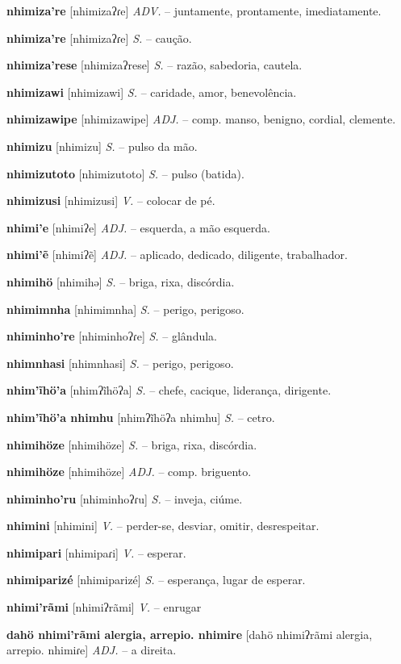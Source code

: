 \textbf{nhimiza're} [nhimizaʔɾe] \textit{ADV.} -- juntamente, prontamente, imediatamente.

\textbf{nhimiza're} [nhimizaʔɾe] \textit{S.} -- caução.

\textbf{nhimiza'rese} [nhimizaʔrese] \textit{S.} -- razão, sabedoria, cautela.

\textbf{nhimizawi} [nhimizawi] \textit{S.} -- caridade, amor, benevolência.

\textbf{nhimizawipe} [nhimizawipe] \textit{ADJ.} -- comp. manso, benigno, cordial, clemente.

\textbf{nhimizu} [nhimizu] \textit{S.} -- pulso da mão.

\textbf{nhimizutoto} [nhimizutoto] \textit{S.} -- pulso (batida).

\textbf{nhimizusi} [nhimizusi] \textit{V.} -- colocar de pé.

\textbf{nhimi'e} [nhimiʔe] \textit{ADJ.} -- esquerda, a mão esquerda.

\textbf{nhimi'ẽ} [nhimiʔẽ] \textit{ADJ.} -- aplicado, dedicado, diligente, trabalhador.

\textbf{nhimihö} [nhimihə] \textit{S.} -- briga, rixa, discórdia.

\textbf{nhimimnha} [nhimimnha] \textit{S.} -- perigo, perigoso.

\textbf{nhiminho're} [nhiminhoʔɾe] \textit{S.} -- glândula.

\textbf{nhimnhasi} [nhimnhasi] \textit{S.} -- perigo, perigoso.

\textbf{nhim'ĩhö'a} [nhimʔĩhöʔa] \textit{S.} -- chefe, cacique, liderança, dirigente.

\textbf{nhim'ĩhö'a nhimhu} [nhimʔĩhöʔa nhimhu] \textit{S.} -- cetro.

\textbf{nhimihöze} [nhimihöze] \textit{S.} -- briga, rixa, discórdia.

\textbf{nhimihöze} [nhimihöze] \textit{ADJ.} -- comp. briguento.

\textbf{nhiminho'ru} [nhiminhoʔɾu] \textit{S.} -- inveja, ciúme.

\textbf{nhimini} [nhimini] \textit{V.} -- perder-se, desviar, omitir, desrespeitar.

\textbf{nhimipari} [nhimipaɾi] \textit{V.} -- esperar.

\textbf{nhimiparizé} [nhimiparizé] \textit{S.} -- esperança, lugar de esperar.

\textbf{nhimi'rãmi} [nhimiʔrãmi] \textit{V.} -- enrugar

\textbf{dahö nhimi'rãmi alergia, arrepio. nhimire} [dahö nhimiʔrãmi alergia, arrepio. nhimiɾe] \textit{ADJ.} -- a direita.

